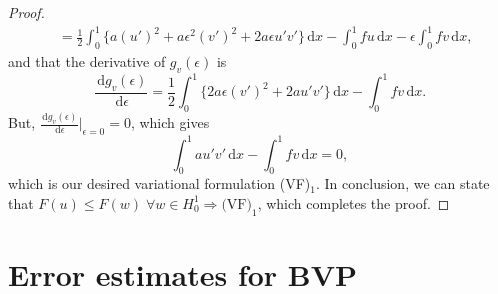 \documentclass[12pt, a4paper]{article}
\newcommand{\rd}{\ensuremath{\mathrm{d}}}
\newcommand{\id}{\ensuremath{\,\rd}}
\numberwithin{equation}{section}
\begin{document}
\begin{proof}
\begin{equation*}
\begin{split}
&= \frac{1}{2}\int_0^1 \{ a(u')^2 + a\epsilon ^2 (v')^2 + 2a\epsilon u' v'\} \id x - \int_0^1 fu \id x - \epsilon \int_0^1 fv \id x,
\end{split}
\end{equation*}
and that the derivative of $g_v(\epsilon)$ is
\begin{equation*}
\frac{\id g_v(\epsilon)}{\id \epsilon} = \frac{1}{2}\int_0^1 \{ 2a\epsilon (v')^2 + 2au'v'\}\id x - \int_0^1 fv\id x.
\end{equation*}
But, $\frac{\id g_v(\epsilon)}{\id \epsilon}\big |_{\epsilon=0} = 0$, which gives
\begin{equation*}
\int_0^1 au'v'\id x - \int_0^1 fv\id x = 0,
\end{equation*}
which is our desired variational formulation (VF)$_1$. In conclusion, we can state that $F(u)\leq F(w)\; \forall w\in H_0^1 \Rightarrow \text{(VF)}_1$, which completes the proof.
\end{proof}

\section{Error estimates for BVP}
\end{document}
